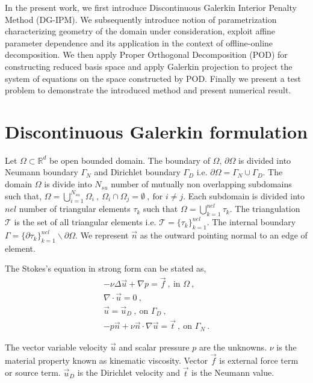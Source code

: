 \documentclass[graybox]{svmult}
\begin{document}
In the present work, we first introduce Discontinuous Galerkin Interior Penalty Method (DG-IPM). We subsequently introduce notion of parametrization characterizing geometry of the domain under consideration, exploit affine parameter dependence and its application in the context of offline-online decomposition. We then apply Proper Orthogonal Decomposition (POD) for constructing reduced basis space and apply Galerkin projection to project the system of equations on the space constructed by POD. Finally we present a test problem to demonstrate the introduced method and present numerical result.
 
\section{Discontinuous Galerkin formulation}
\label{DG_formulation}

Let $\Omega \subset \mathbb{R}^d$ be open bounded domain. The boundary of $\Omega$, $\partial \Omega$ is divided into Neumann boundary $\Gamma_N$ and Dirichlet boundary $\Gamma_D$ i.e. $\partial \Omega = \Gamma_N \cup \Gamma_D$. The domain $\Omega$ is divide into $N_{su}$ number of mutually non overlapping subdomains such that, $\Omega = \bigcup\limits_{i=1}^{N_{su}} \Omega_i \ , \ \Omega_i \cap \Omega_j = \emptyset \ , \ \text{for } i \neq j$. Each subdomain is divided into $nel$ number of triangular elements $\tau_k$ such that $\Omega = \bigcup\limits_{k=1}^{nel} \tau_k$. The triangulation $\mathcal{T}$ is the set of all triangular elements i.e. $\mathcal{T} = \lbrace \tau_k \rbrace_{k=1}^{nel}$. The internal boundary $\Gamma = \lbrace \partial \tau_k \rbrace_{k=1}^{nel} \backslash \partial \Omega$. We represent $\overrightarrow{n}$ as the outward pointing normal to an edge of element.

The Stokes's equation in strong form can be stated as,
\begin{gather}
-\nu \Delta \overrightarrow{u} + \nabla p = \overrightarrow{f} \ , \ \text{in } \Omega \ , \\
\nabla \cdot \overrightarrow{u} = 0 \ , \\
\overrightarrow{u} = \overrightarrow{u}_D \ , \ \text{on } \Gamma_D \ , \\
-p \overrightarrow{n} + \nu \overrightarrow{n} \cdot \nabla \overrightarrow{u} = \overrightarrow{t} \ , \ \text{on } \Gamma_N \ .
\end{gather}

The vector variable velocity $\overrightarrow{u}$ and scalar pressure $p$ are the unknowns. $\nu$ is the material property known as kinematic viscosity. Vector $\overrightarrow{f}$ is external force term or source term. $\overrightarrow{u}_D$ is the Dirichlet velocity and $\overrightarrow{t}$ is the Neumann value.
\end{document}
